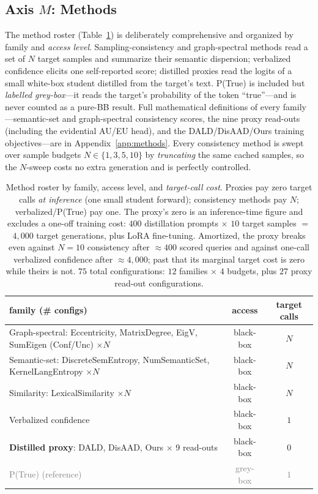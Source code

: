 \documentclass[11pt]{article}
\newcommand{\grey}[1]{\textcolor{gray}{#1}}
\begin{document}
\subsection{Axis $M$: Methods}
The method roster (Table~\ref{tab:roster}) is deliberately comprehensive and organized by
family and \emph{access level}. Sampling-consistency and graph-spectral methods read a
set of $N$ target samples and summarize their semantic dispersion; verbalized confidence
elicits one self-reported score; distilled proxies read the logits of a small white-box
student distilled from the target's text. P(True) is included but \emph{labelled
grey-box}---it reads the target's probability of the token ``true''---and is never
counted as a pure-BB result. Full mathematical definitions of every family---semantic-set
and graph-spectral consistency scores, the nine proxy read-outs (including the evidential
AU/EU head), and the DALD/DisAAD/Ours training objectives---are in
Appendix~\ref{app:methods}. Every consistency method is swept over sample budgets
$N\in\{1,3,5,10\}$ by \emph{truncating} the same cached samples, so the $N$-sweep costs no
extra generation and is perfectly controlled.

\begin{table}[t]\centering\small
\setlength{\tabcolsep}{3pt}
\begin{tabular}{p{3.5cm} c c}
\toprule
family (\# configs) & access & target calls\\
\midrule
Graph-spectral: Eccentricity, MatrixDegree, EigV, SumEigen (Conf/Unc) $\times N$ & black-box & $N$\\
Semantic-set: DiscreteSemEntropy, NumSemanticSet, KernelLangEntropy $\times N$ & black-box & $N$\\
Similarity: LexicalSimilarity $\times N$ & black-box & $N$\\
Verbalized confidence & black-box & $1$\\
\textbf{Distilled proxy}: DALD, DisAAD, Ours $\times$ 9 read-outs & black-box & $0$\\
\grey{P(True) (reference)} & \grey{grey-box} & \grey{$1$}\\
\bottomrule
\end{tabular}
\caption{Method roster by family, access level, and \emph{target-call cost}. Proxies pay
zero target calls \emph{at inference} (one small student forward); consistency methods pay $N$;
verbalized/P(True) pay one. The proxy's zero is an inference-time figure and excludes a
one-off training cost: $400$ distillation prompts $\times$ $10$ target samples $=$ $4{,}000$
target generations, plus LoRA fine-tuning. Amortized, the proxy breaks even against $N{=}10$
consistency after ${\approx}400$ scored queries and against one-call verbalized confidence after
${\approx}4{,}000$; past that its marginal target cost is zero while theirs is not. $75$ total configurations: $12$ families $\times$ $4$ budgets, plus $27$ proxy read-out configurations.}
\label{tab:roster}
\end{table}
\end{document}
